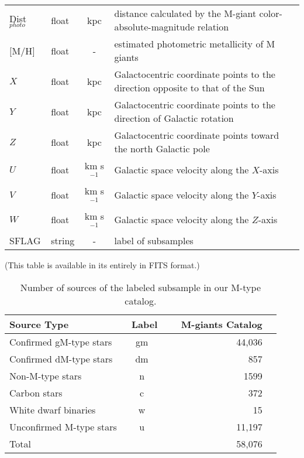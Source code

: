\documentclass[manuscript]{aastex62}
\begin{document}
\begin{CJK*}{UTF8}{gbsn}
\begin{table*}
\begin{tabular}{llcl}
Dist$_{photo}$ & float & kpc &  distance calculated by the
M-giant color-absolute-magnitude relation \\
$[$M/H$]$ & float &  - & estimated photometric metallicity of M giants\\
$X$ & float & kpc & Galactocentric coordinate points to the direction opposite to that of the Sun \\
$Y$ & float & kpc & Galactocentric coordinate points to the direction of Galactic rotation \\
$Z$ & float & kpc & Galactocentric coordinate points toward the north Galactic pole   \\
$U$ & float & km s$^{-1}$ & Galactic space velocity along the $X$-axis   \\
$V$ & float & km s$^{-1}$ & Galactic space velocity along the $Y$-axis    \\
$W$ & float & km s$^{-1}$ & Galactic space velocity along the $Z$-axis   \\
SFLAG & string  & - & label of subsamples  \\
\hline
\end{tabular}
\begin{flushleft}
(This table is available in its entirely in FITS format.)
\end{flushleft}
\end{table*}

\begin{table*}
\caption{Number of sources of the labeled subsample in our M-type catalog.}
\label{sub}
 \centering
\begin{tabular}{lcrr}
\hline
 Source Type & ~Label &~~ M-giants Catalog \\
\hline
Confirmed gM-type stars   &   gm  &  44,036\\
Confirmed dM-type stars   &   dm  &  857\\
Non-M-type stars  & n & 1599\\
Carbon stars & c & 372\\
White dwarf binaries & w & 15\\
Unconfirmed M-type stars &  u &  11,197\\
\hline
Total & & 58,076\\
\hline
\end{tabular}
\end{table*}



\end{CJK*}
\end{document}
